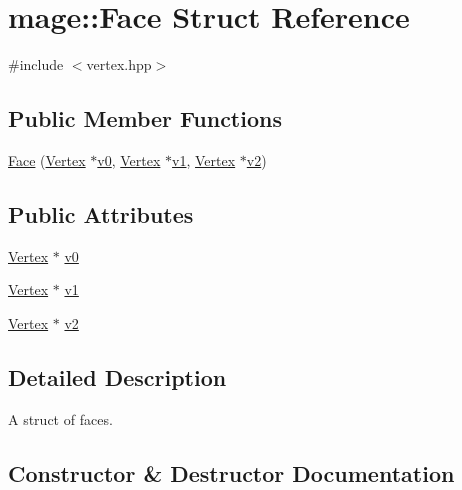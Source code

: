 \hypertarget{structmage_1_1_face}{}\section{mage\+:\+:Face Struct Reference}
\label{structmage_1_1_face}


{\ttfamily \#include $<$vertex.\+hpp$>$}

\subsection*{Public Member Functions}
\begin{DoxyCompactItemize}
\item 
\hyperlink{structmage_1_1_face_a67d33d5e7741cc21d397161f79af19bb}{Face} (\hyperlink{structmage_1_1_vertex}{Vertex} $\ast$\hyperlink{structmage_1_1_face_a8a99c634b7b8dbb37ff3eb70308506dd}{v0}, \hyperlink{structmage_1_1_vertex}{Vertex} $\ast$\hyperlink{structmage_1_1_face_a811aaac2c5e02052763ebdaef4121da0}{v1}, \hyperlink{structmage_1_1_vertex}{Vertex} $\ast$\hyperlink{structmage_1_1_face_a5ad0b031cb4445cef137e1e8b2fa79c8}{v2})
\end{DoxyCompactItemize}
\subsection*{Public Attributes}
\begin{DoxyCompactItemize}
\item 
\hyperlink{structmage_1_1_vertex}{Vertex} $\ast$ \hyperlink{structmage_1_1_face_a8a99c634b7b8dbb37ff3eb70308506dd}{v0}
\item 
\hyperlink{structmage_1_1_vertex}{Vertex} $\ast$ \hyperlink{structmage_1_1_face_a811aaac2c5e02052763ebdaef4121da0}{v1}
\item 
\hyperlink{structmage_1_1_vertex}{Vertex} $\ast$ \hyperlink{structmage_1_1_face_a5ad0b031cb4445cef137e1e8b2fa79c8}{v2}
\end{DoxyCompactItemize}


\subsection{Detailed Description}
A struct of faces. 

\subsection{Constructor \& Destructor Documentation}
\hypertarget{structmage_1_1_face_a67d33d5e7741cc21d397161f79af19bb}{}\label{structmage_1_1_face_a67d33d5e7741cc21d397161f79af19bb} 
